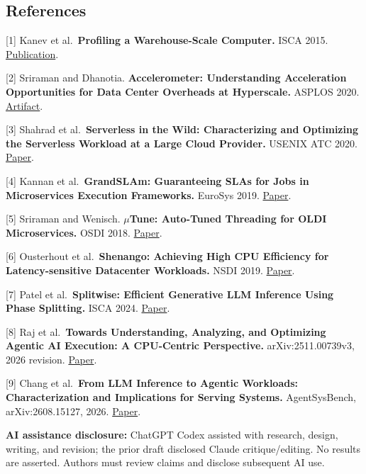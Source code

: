 \documentclass[10pt]{article}
\begin{document}
\hypertarget{references}{%
\subsection{References}\label{references}}

{[}1{]} Kanev et al.~\textbf{Profiling a Warehouse-Scale Computer.} ISCA
2015.
\href{https://research.google/pubs/profiling-a-warehouse-scale-computer/}{Publication}.

{[}2{]} Sriraman and Dhanotia. \textbf{Accelerometer: Understanding
Acceleration Opportunities for Data Center Overheads at Hyperscale.}
ASPLOS 2020.
\href{https://github.com/akshithasriraman/Accelerometer}{Artifact}.

{[}3{]} Shahrad et al.~\textbf{Serverless in the Wild: Characterizing
and Optimizing the Serverless Workload at a Large Cloud Provider.}
USENIX ATC 2020.
\href{https://www.usenix.org/conference/atc20/presentation/shahrad}{Paper}.

{[}4{]} Kannan et al.~\textbf{GrandSLAm: Guaranteeing SLAs for Jobs in
Microservices Execution Frameworks.} EuroSys 2019.
\href{https://ramsrivatsa.github.io/papers/kannan_eurosys19.pdf}{Paper}.

{[}5{]} Sriraman and Wenisch. \textbf{\(\mu\)Tune: Auto-Tuned Threading
for OLDI Microservices.} OSDI 2018.
\href{https://www.usenix.org/conference/osdi18/presentation/sriraman}{Paper}.

{[}6{]} Ousterhout et al.~\textbf{Shenango: Achieving High CPU
Efficiency for Latency-sensitive Datacenter Workloads.} NSDI 2019.
\href{https://www.usenix.org/conference/nsdi19/presentation/ousterhout}{Paper}.

{[}7{]} Patel et al.~\textbf{Splitwise: Efficient Generative LLM
Inference Using Phase Splitting.} ISCA 2024.
\href{https://www.microsoft.com/en-us/research/publication/splitwise-efficient-generative-llm-inference-using-phase-splitting/}{Paper}.

{[}8{]} Raj et al.~\textbf{Towards Understanding, Analyzing, and
Optimizing Agentic AI Execution: A CPU-Centric Perspective.}
arXiv:2511.00739v3, 2026 revision.
\href{https://arxiv.org/abs/2511.00739v3}{Paper}.

{[}9{]} Chang et al.~\textbf{From LLM Inference to Agentic Workloads:
Characterization and Implications for Serving Systems.} AgentSysBench,
arXiv:2608.15127, 2026. \href{https://arxiv.org/abs/2608.15127}{Paper}.

\textbf{AI assistance disclosure:} ChatGPT Codex assisted with research,
design, writing, and revision; the prior draft disclosed Claude
critique/editing. No results are asserted. Authors must review claims
and disclose subsequent AI use.
\end{document}
